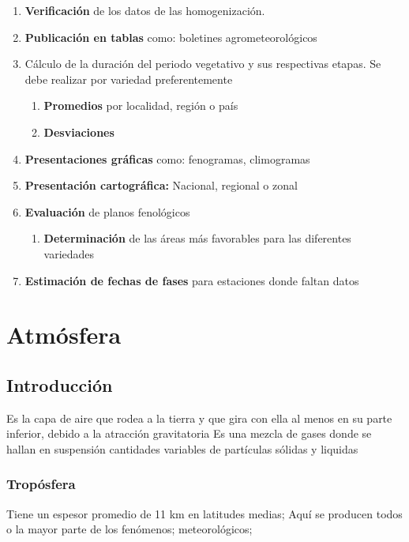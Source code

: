\begin{enumerate}
    \item \textbf{Verificación} de los datos de las homogenización.
    \item \textbf{Publicación en tablas} como: boletines agrometeorológicos
    \item Cálculo de la duración del periodo vegetativo y sus respectivas etapas. Se debe realizar por variedad preferentemente \begin{enumerate}
        \item \textbf{Promedios} por localidad, región o país
        \item \textbf{Desviaciones}
    \end{enumerate}
    \item \textbf{Presentaciones gráficas} como: fenogramas, climogramas
    \item \textbf{Presentación cartográfica:} Nacional, regional o zonal
    \item \textbf{Evaluación} de planos fenológicos \begin{enumerate}
        \item \textbf{Determinación} de las áreas más favorables para las diferentes variedades
    \end{enumerate}
    \item \textbf{Estimación de fechas de fases} para estaciones donde faltan datos
\end{enumerate}

\section{Atmósfera}
\subsection{Introducción}
\begin{definition}[Atmósfera]
    Es la capa de aire que rodea a la tierra y que gira con ella al menos en su parte inferior, debido a la atracción gravitatoria
Es una mezcla de gases donde se hallan en suspensión cantidades variables de partículas sólidas y liquidas
\end{definition}
\subsubsection{Tropósfera}
Tiene un espesor promedio de 11 km en latitudes medias; Aquí se producen todos o la mayor parte de los fenómenos; meteorológicos;

